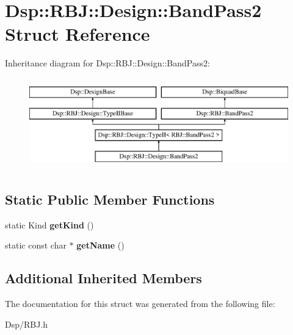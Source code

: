 \hypertarget{structDsp_1_1RBJ_1_1Design_1_1BandPass2}{\section{Dsp\-:\-:R\-B\-J\-:\-:Design\-:\-:Band\-Pass2 Struct Reference}
\label{structDsp_1_1RBJ_1_1Design_1_1BandPass2}
}
Inheritance diagram for Dsp\-:\-:R\-B\-J\-:\-:Design\-:\-:Band\-Pass2\-:\begin{figure}[H]
\begin{center}
\leavevmode
\includegraphics[height=4.000000cm]{structDsp_1_1RBJ_1_1Design_1_1BandPass2}
\end{center}
\end{figure}
\subsection*{Static Public Member Functions}
\begin{DoxyCompactItemize}
\item 
\hypertarget{structDsp_1_1RBJ_1_1Design_1_1BandPass2_ac0512df51076360842c640af77e22d8d}{static Kind {\bfseries get\-Kind} ()}\label{structDsp_1_1RBJ_1_1Design_1_1BandPass2_ac0512df51076360842c640af77e22d8d}

\item 
\hypertarget{structDsp_1_1RBJ_1_1Design_1_1BandPass2_a7d9ed34998c99006f65c8cc3ff9560ba}{static const char $\ast$ {\bfseries get\-Name} ()}\label{structDsp_1_1RBJ_1_1Design_1_1BandPass2_a7d9ed34998c99006f65c8cc3ff9560ba}

\end{DoxyCompactItemize}
\subsection*{Additional Inherited Members}


The documentation for this struct was generated from the following file\-:\begin{DoxyCompactItemize}
\item 
Dsp/R\-B\-J.\-h\end{DoxyCompactItemize}
